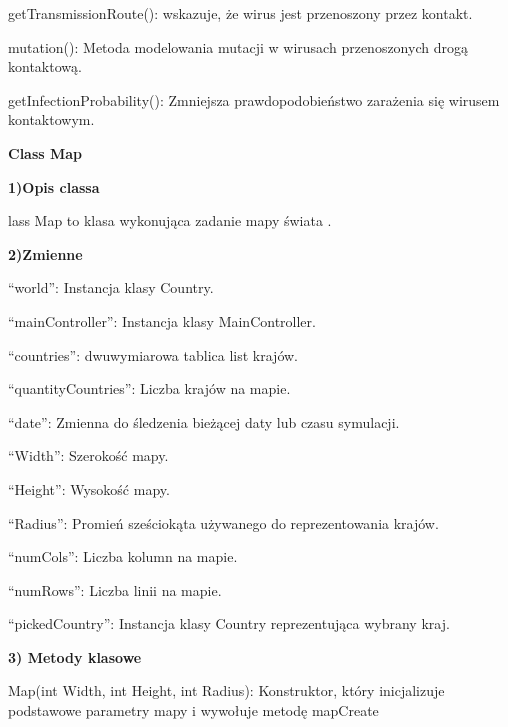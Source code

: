 \documentclass[a4paper]{article}
\begin{document}
\foreignlanguage{polish}{getTransmissionRoute(): wskazuje, że wirus jest przenoszony przez kontakt.}

\foreignlanguage{polish}{mutation(): Metoda modelowania mutacji w wirusach przenoszonych drogą kontaktową.}

\foreignlanguage{polish}{getInfectionProbability(): Zmniejsza prawdopodobieństwo zarażenia się wirusem kontaktowym.}


\bigskip


\bigskip

{\centering
\foreignlanguage{polish}{\textbf{Class Map}}
\par}
\vspace{6pt}
\foreignlanguage{polish}{\textbf{1)Opis classa}}

\foreignlanguage{english}{}\foreignlanguage{polish}{lass Map to klasa wykonująca zadanie mapy świata .}


\bigskip

\foreignlanguage{english}{\textbf{2)Zmienne}}

\foreignlanguage{english}{“world”: Instancja klasy Country.}

\foreignlanguage{english}{“mainController”: Instancja klasy MainController.}

\foreignlanguage{polish}{“countries”: dwuwymiarowa tablica list krajów.}

\foreignlanguage{polish}{“quantityCountries”: Liczba krajów na mapie.}

\foreignlanguage{polish}{“date”: Zmienna do śledzenia bieżącej daty lub czasu symulacji.}

\foreignlanguage{polish}{“Width”: Szerokość mapy.}

\foreignlanguage{polish}{“Height”: Wysokość mapy.}

\foreignlanguage{polish}{“Radius”: Promień sześciokąta używanego do reprezentowania krajów.}

\foreignlanguage{polish}{“numCols”: Liczba kolumn na mapie.}

\foreignlanguage{polish}{“numRows”: Liczba linii na mapie.}

\foreignlanguage{polish}{“pickedCountry”: Instancja klasy Country reprezentująca wybrany kraj.}


\bigskip

\foreignlanguage{polish}{\textbf{3) Metody klasowe}}

\foreignlanguage{polish}{Map(int Width, int Height, int Radius): Konstruktor, który inicjalizuje podstawowe parametry
mapy i wywołuje metodę mapCreate}
\end{document}
